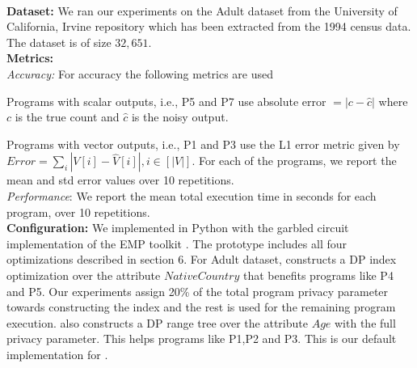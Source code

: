\\\textbf{Dataset:}
We ran our experiments on the Adult dataset from the University of California, Irvine repository \cite{UCI}  which has been extracted from the 1994 census data. The dataset is of size $32,651$.
\\\textbf{Metrics:}
\\\textit{Accuracy:} For accuracy the following metrics are used
\squishlist \item Programs with scalar outputs, i.e.,  P5 and P7 use absolute error $ =|c-\hat{c}|$ where $c$ is the true count and $\hat{c}$ is the noisy output.\item Programs with vector outputs, i.e., P1 and P3 use the L1 error metric given  by $Error=\sum_{i}|V[i]-\hat{V}[i]|, i \in [|V|]$.
\squishend
For each of the programs, we report the mean and std error values over 10 repetitions.
\\\textit{Performance}: We report the mean total execution time in seconds for each program, over 10 repetitions.
\\\textbf{Configuration:} We implemented \system in Python with the garbled circuit implementation of  the EMP
toolkit \cite{EMP}. The prototype  includes all four 
optimizations described in section 6.
For Adult dataset, \system constructs a DP index optimization over
the attribute $NativeCountry$ that benefits programs like P4 and P5. Our experiments assign
20\% of the total program privacy parameter towards constructing the index
and the rest is used for the remaining program execution. \system also constructs a
DP range tree over the attribute $Age$ with the full privacy parameter. This helps programs like P1,P2 and P3. This is our default implementation for \system. %



